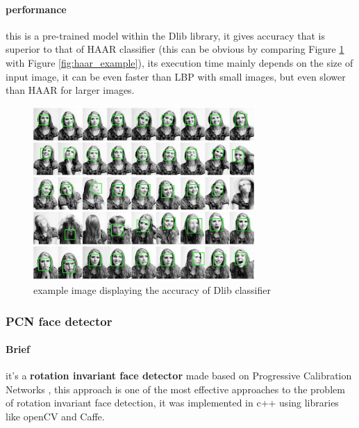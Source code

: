 \paragraph{performance}
this is a pre-trained model within the Dlib library, it gives accuracy that is superior to that of HAAR classifier (this can be obvious by comparing Figure \ref{fig:dlib_example} with Figure \ref{fig:haar_example}), its execution time mainly depends on the size of input image, it can be even faster than LBP with small images, but even slower than HAAR for larger images.


\begin{figure}
	\centering
	\includegraphics[width=0.75\textwidth]{images/dlib_example.jpg}
	\caption{example image displaying the accuracy of Dlib classifier}
	\label{fig:dlib_example}
\end{figure}

\subsubsection{PCN face detector}
\paragraph{Brief}
it's a \textbf{rotation invariant face detector} made based on Progressive Calibration Networks \cite{PCN}, this approach is one of the most effective approaches to the problem of rotation invariant face detection, it was implemented in c++ using libraries like openCV and Caffe.
